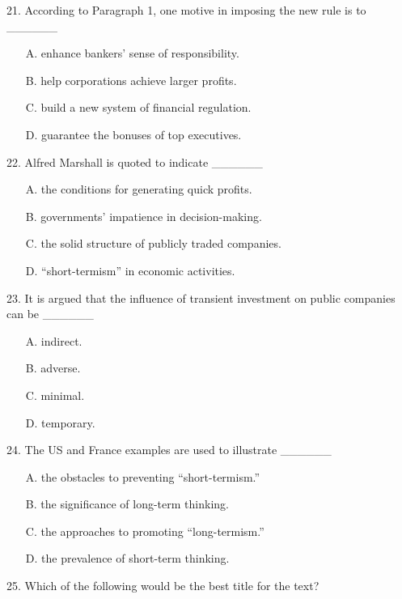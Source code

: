\documentclass[UTF8,11pt]{ctexart}
\begin{document}
21. According to Paragraph 1, one motive in imposing the new rule is to \_\_\_\_\_\_


\begin{itemize}[leftmargin=2em,itemsep=.2em,topsep=.4em]\item[A.] enhance bankers’ sense of responsibility.
\item[B.] help corporations achieve larger profits.
\item[C.] build a new system of financial regulation.
\item[D.] guarantee the bonuses of top executives.
\end{itemize}

22. Alfred Marshall is quoted to indicate \_\_\_\_\_\_


\begin{itemize}[leftmargin=2em,itemsep=.2em,topsep=.4em]\item[A.] the conditions for generating quick profits.
\item[B.] governments’ impatience in decision-making.
\item[C.] the solid structure of publicly traded companies.
\item[D.] “short-termism” in economic activities.
\end{itemize}

23. It is argued that the influence of transient investment on public companies can be \_\_\_\_\_\_


\begin{itemize}[leftmargin=2em,itemsep=.2em,topsep=.4em]\item[A.] indirect.
\item[B.] adverse.
\item[C.] minimal.
\item[D.] temporary.
\end{itemize}

24. The US and France examples are used to illustrate \_\_\_\_\_\_


\begin{itemize}[leftmargin=2em,itemsep=.2em,topsep=.4em]\item[A.] the obstacles to preventing “short-termism.”
\item[B.] the significance of long-term thinking.
\item[C.] the approaches to promoting “long-termism.”
\item[D.] the prevalence of short-term thinking.
\end{itemize}

25. Which of the following would be the best title for the text?
\end{document}
